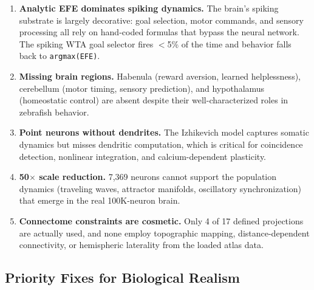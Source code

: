 \documentclass[11pt,a4paper]{article}
\begin{document}
\begin{enumerate}[leftmargin=*]
\item \textbf{Analytic EFE dominates spiking dynamics.}
  The brain's spiking substrate is largely decorative: goal selection,
  motor commands, and sensory processing all rely on hand-coded formulas
  that bypass the neural network.  The spiking WTA goal selector fires
  $<$5\% of the time and behavior falls back to \texttt{argmax(EFE)}.

\item \textbf{Missing brain regions.}
  Habenula (reward aversion, learned helplessness), cerebellum
  (motor timing, sensory prediction), and hypothalamus (homeostatic control)
  are absent despite their well-characterized roles in zebrafish behavior.

\item \textbf{Point neurons without dendrites.}
  The Izhikevich model captures somatic dynamics but misses dendritic
  computation, which is critical for coincidence detection, nonlinear
  integration, and calcium-dependent plasticity.

\item \textbf{50$\times$ scale reduction.}
  7,369 neurons cannot support the population dynamics (traveling waves,
  attractor manifolds, oscillatory synchronization) that emerge in
  the real 100K-neuron brain.

\item \textbf{Connectome constraints are cosmetic.}
  Only 4 of 17 defined projections are actually used, and none employ
  topographic mapping, distance-dependent connectivity, or hemispheric
  laterality from the loaded atlas data.
\end{enumerate}

\subsection{Priority Fixes for Biological Realism}
\end{document}
